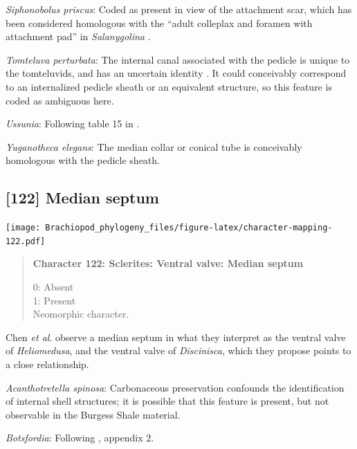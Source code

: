 \documentclass[openany]{book}
\begin{document}
\hypertarget{Siphonobolus_priscus-coding-121}{}
\emph{Siphonobolus priscus}: Coded as present in view of the attachment
scar, which has been considered homologous with the ``adult colleplax
and foramen with attachment pad'' in \emph{Salanygolina}
\citep{Popov2009Earlyontogeny}.

\hypertarget{Tomteluva_perturbata-coding-121}{}
\emph{Tomteluva perturbata}: The internal canal associated with the
pedicle is unique to the tomteluvids, and has an uncertain identity
\citep{Streng2016Anew}. It could conceivably correspond to an
internalized pedicle sheath or an equivalent structure, so this feature
is coded as ambiguous here.

\hypertarget{Ussunia-coding-121}{}
\emph{Ussunia}: Following table 15 in
\citet{Williams2000LinguliformeaCraniiformea}.

\hypertarget{Yuganotheca_elegans-coding-121}{}
\emph{Yuganotheca elegans}: The median collar or conical tube is
conceivably homologous with the pedicle sheath.

\subsection*{{[}122{]} Median septum}\label{median-septum}

\texttt{[image: Brachiopod\_phylogeny\_files/figure-latex/character-mapping-122.pdf]}

\begin{quote}
\textbf{Character 122: Sclerites: Ventral valve: Median septum}

0: Absent\\
1: Present\\
Neomorphic character.
\end{quote}

Chen \emph{et al}. \citeyearpar{Chen2007Reinterpretationof} observe a
median septum in what they interpret as the ventral valve of
\emph{Heliomedusa}, and the ventral valve of \emph{Discinisca}, which
they propose points to a close relationship.

\hypertarget{Acanthotretella_spinosa-coding-122}{}
\emph{Acanthotretella spinosa}: Carbonaceous preservation confounds the
identification of internal shell structures; it is possible that this
feature is present, but not observable in the Burgess Shale material.

\hypertarget{Botsfordia-coding-122}{}
\emph{Botsfordia}: Following \citet{Williams1998Thediversity}, appendix
2.
\end{document}
